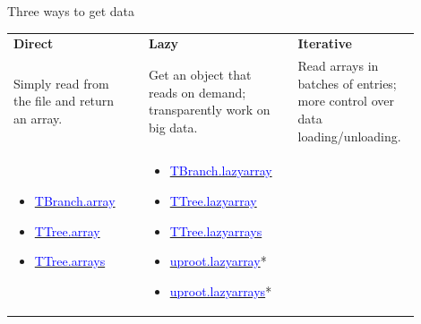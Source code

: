 \documentclass[aspectratio=169]{beamer}
\begin{document}
\begin{frame}{Three ways to get data}
\begin{center}
\renewcommand{\arraystretch}{1.5}
\begin{tabular}{p{0.3\linewidth} c p{0.3\linewidth} c p{0.3\linewidth}}
{\LARGE\bf Direct} & & {\LARGE\bf Lazy} & & {\LARGE\bf Iterative} \\
Simply read from the file and return an array. & & Get an object that reads on demand; transparently work on big data. & & Read arrays in batches of entries; more control over data loading/unloading. \\
\begin{minipage}{\linewidth}
\vspace{0.5\baselineskip}
\begin{itemize}
\item \href{https://uproot.readthedocs.io/en/latest/ttree-handling.html\#id11}{\textcolor{blue}{TBranch.array}}
\item \href{https://uproot.readthedocs.io/en/latest/ttree-handling.html\#array}{\textcolor{blue}{TTree.array}}
\item \href{https://uproot.readthedocs.io/en/latest/ttree-handling.html\#arrays}{\textcolor{blue}{TTree.arrays}}
\end{itemize}
\vspace{2\baselineskip}
\end{minipage} & &
\begin{minipage}{\linewidth}
\vspace{0.5\baselineskip}
\begin{itemize}
\item \href{https://uproot.readthedocs.io/en/latest/ttree-handling.html\#id13}{\textcolor{blue}{TBranch.lazyarray}}
\item \href{https://uproot.readthedocs.io/en/latest/ttree-handling.html\#lazyarray}{\textcolor{blue}{TTree.lazyarray}}
\item \href{https://uproot.readthedocs.io/en/latest/ttree-handling.html\#lazyarrays}{\textcolor{blue}{TTree.lazyarrays}}
\item \href{https://uproot.readthedocs.io/en/latest/opening-files.html\#uproot-lazyarray-and-lazyarrays}{\textcolor{blue}{uproot.lazyarray}}*
\item \href{https://uproot.readthedocs.io/en/latest/opening-files.html\#uproot-lazyarray-and-lazyarrays}{\textcolor{blue}{uproot.lazyarrays}}*
\end{itemize}
\end{minipage} & &

\end{tabular}
\end{center}
\end{frame}
\end{document}

